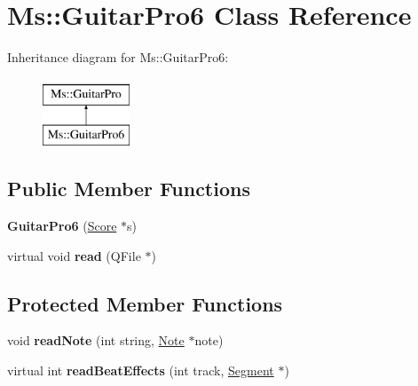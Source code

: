 \hypertarget{class_ms_1_1_guitar_pro6}{}\section{Ms\+:\+:Guitar\+Pro6 Class Reference}
\label{class_ms_1_1_guitar_pro6}
Inheritance diagram for Ms\+:\+:Guitar\+Pro6\+:\begin{figure}[H]
\begin{center}
\leavevmode
\includegraphics[height=2.000000cm]{class_ms_1_1_guitar_pro6}
\end{center}
\end{figure}
\subsection*{Public Member Functions}
\begin{DoxyCompactItemize}
\item 
\mbox{\label{class_ms_1_1_guitar_pro6_aa25825db20c3a4075efeea105bedc547}} 
{\bfseries Guitar\+Pro6} (\hyperlink{class_ms_1_1_score}{Score} $\ast$s)
\item 
\mbox{\label{class_ms_1_1_guitar_pro6_a8e18363071252c981ac162f2af9ac36f}} 
virtual void {\bfseries read} (Q\+File $\ast$)
\end{DoxyCompactItemize}
\subsection*{Protected Member Functions}
\begin{DoxyCompactItemize}
\item 
\mbox{\label{class_ms_1_1_guitar_pro6_a59100ddfe46ef7e77cafaa10943b4aa6}} 
void {\bfseries read\+Note} (int string, \hyperlink{class_ms_1_1_note}{Note} $\ast$note)
\item 
\mbox{\label{class_ms_1_1_guitar_pro6_af86f0cd6cd5bf7acbc40c08635b07cbe}} 
virtual int {\bfseries read\+Beat\+Effects} (int track, \hyperlink{class_ms_1_1_segment}{Segment} $\ast$)
\end{DoxyCompactItemize}

